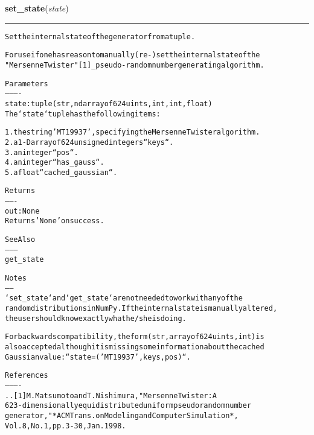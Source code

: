 \hspace{.8\funcindent}\begin{boxedminipage}{\funcwidth}

    \raggedright \textbf{set\_state}(\textit{state})

    \vspace{-1.5ex}

    \rule{\textwidth}{0.5\fboxrule}
\setlength{\parskip}{2ex}
\begin{alltt}
Set the internal state of the generator from a tuple.

For use if one has reason to manually (re-)set the internal state of the
"Mersenne Twister"[1]\_ pseudo-random number generating algorithm.

Parameters
----------
state : tuple(str, ndarray of 624 uints, int, int, float)
    The `state` tuple has the following items:

    1. the string 'MT19937', specifying the Mersenne Twister algorithm.
    2. a 1-D array of 624 unsigned integers ``keys``.
    3. an integer ``pos``.
    4. an integer ``has\_gauss``.
    5. a float ``cached\_gaussian``.

Returns
-------
out : None
    Returns 'None' on success.

See Also
--------
get\_state

Notes
-----
`set\_state` and `get\_state` are not needed to work with any of the
random distributions in NumPy. If the internal state is manually altered,
the user should know exactly what he/she is doing.

For backwards compatibility, the form (str, array of 624 uints, int) is
also accepted although it is missing some information about the cached
Gaussian value: ``state = ('MT19937', keys, pos)``.

References
----------
.. [1] M. Matsumoto and T. Nishimura, "Mersenne Twister: A
   623-dimensionally equidistributed uniform pseudorandom number
   generator," *ACM Trans. on Modeling and Computer Simulation*,
   Vol. 8, No. 1, pp. 3-30, Jan. 1998.
\end{alltt}

\setlength{\parskip}{1ex}
    \end{boxedminipage}

    \label{trunk:qstkutil:bollinger:shuffle}

    \vspace{0.5ex}

